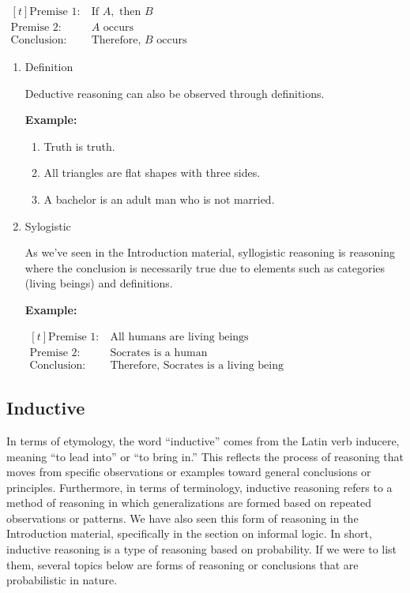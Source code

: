 \documentclass[12pt,a4paper,openany]{article}
\begin{document}
\noindent
\(
\begin{aligned}[t]
 \text{Premise 1:} \ & \text{If } A, \text{ then } B \\
 \text{Premise 2:} \ & A \text{ occurs} \\
 \text{Conclusion:} \ & \text{Therefore, } B \text{ occurs}
\end{aligned}
\)
\begin{enumerate}

\item Definition

Deductive reasoning can also be observed through definitions.

\textbf{Example:}

\begin{enumerate}
\item Truth is truth.
\item All triangles are flat shapes with three sides.
\item A bachelor is an adult man who is not married.
\end{enumerate}

\item Sylogistic

As we've seen in the Introduction material, syllogistic reasoning is
reasoning where the conclusion is necessarily true due to elements
such as categories (living beings) and definitions.

\textbf{Example:}

\noindent
\(
\begin{aligned}[t]
 \text{Premise 1:} \ & \text{All humans are living beings} \\
 \text{Premise 2:} \ & \text{Socrates is a human} \\
 \text{Conclusion:} \ & \text{Therefore, Socrates is a living being}
\end{aligned}
\)

\end{enumerate}

\subsection{Inductive}\label{inductive}

In terms of etymology, the word ``inductive'' comes from the Latin verb
inducere, meaning ``to lead into'' or ``to bring in.'' This reflects the
process of reasoning that moves from specific observations or examples
toward general conclusions or principles. Furthermore, in terms of
terminology, inductive reasoning refers to a method of reasoning in
which generalizations are formed based on repeated observations or
patterns. We have also seen this form of reasoning in the Introduction
material, specifically in the section on informal logic. In short,
inductive reasoning is a type of reasoning based on probability. If we
were to list them, several topics below are forms of reasoning or
conclusions that are probabilistic in nature.
\end{document}
